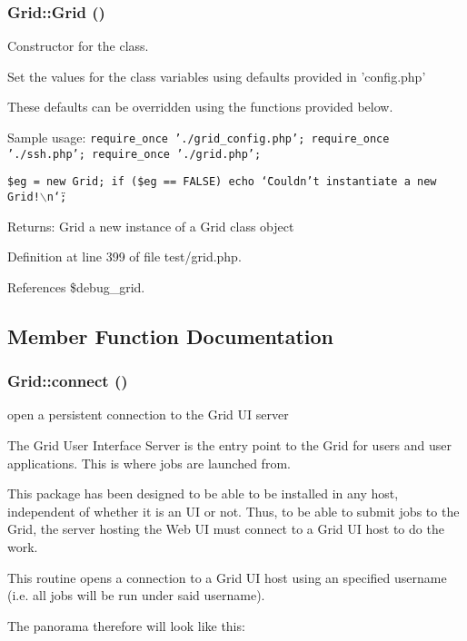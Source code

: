 \subsubsection{\setlength{\rightskip}{0pt plus 5cm}Grid::Grid ()}\label{classGrid_a26}


Constructor for the class. 

Set the values for the class variables using defaults provided in 'config.php'

These defaults can be overridden using the functions provided below.

Sample usage: {\tt  require\_\-once './grid\_\-config.php'; require\_\-once './ssh.php'; require\_\-once './grid.php';}

{\tt  \$eg = new Grid; if (\$eg == FALSE) echo \char`\"{}Couldn't instantiate a new Grid!$\backslash$n\char`\"{}; }

\begin{Desc}
\item[Returns:]Grid a new instance of a Grid class object \end{Desc}


Definition at line 399 of file test/grid.php.

References \$debug\_\-grid.

\subsection{Member Function Documentation}
\subsubsection{\setlength{\rightskip}{0pt plus 5cm}Grid::connect ()}\label{classGrid_a36}


open a persistent connection to the Grid UI server 

The Grid User Interface Server is the entry point to the Grid for users and user applications. This is where jobs are launched from.

This package has been designed to be able to be installed in any host, independent of whether it is an UI or not. Thus, to be able to submit jobs to the Grid, the server hosting the Web UI must connect to a Grid UI host to do the work.

This routine opens a connection to a Grid UI host using an specified username (i.e. all jobs will be run under said username).

The panorama therefore will look like this:

